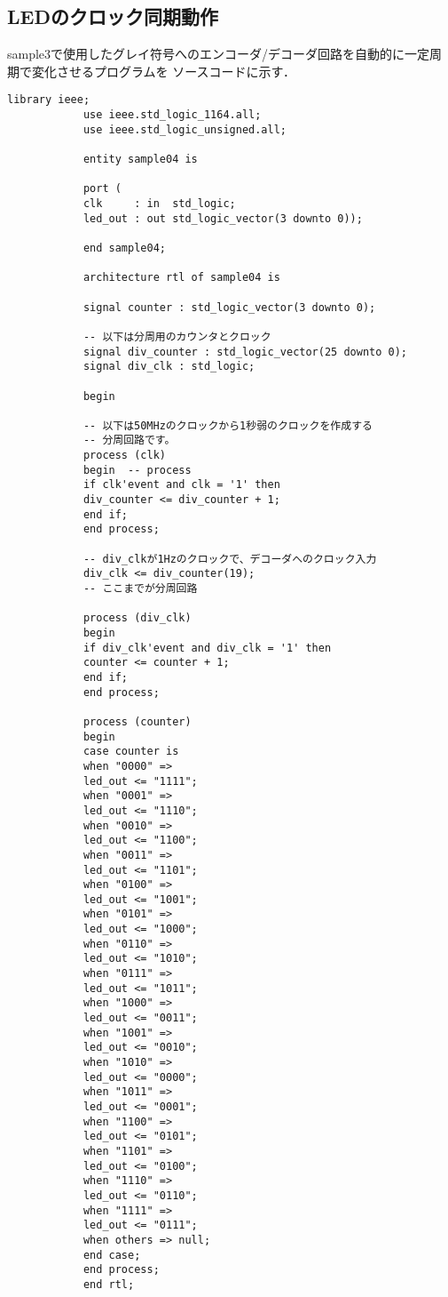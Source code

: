 \documentclass{ltjsarticle}
\begin{document}
	\subsection{LEDのクロック同期動作}
		sample3で使用したグレイ符号へのエンコーダ/デコーダ回路を自動的に一定周期で変化させるプログラムを
		ソースコードに示す．
		\begin{lstlisting}[caption=sample4, label=sample4]
			library ieee;
			use ieee.std_logic_1164.all;
			use ieee.std_logic_unsigned.all;

			entity sample04 is

			port (
			clk     : in  std_logic;
			led_out : out std_logic_vector(3 downto 0));

			end sample04;

			architecture rtl of sample04 is

			signal counter : std_logic_vector(3 downto 0);

			-- 以下は分周用のカウンタとクロック
			signal div_counter : std_logic_vector(25 downto 0);
			signal div_clk : std_logic;

			begin

			-- 以下は50MHzのクロックから1秒弱のクロックを作成する
			-- 分周回路です。
			process (clk)
			begin  -- process
			if clk'event and clk = '1' then
			div_counter <= div_counter + 1;
			end if;
			end process;

			-- div_clkが1Hzのクロックで、デコーダへのクロック入力
			div_clk <= div_counter(19);
			-- ここまでが分周回路

			process (div_clk)
			begin
			if div_clk'event and div_clk = '1' then
			counter <= counter + 1;
			end if;
			end process;

			process (counter)
			begin
			case counter is
			when "0000" =>
			led_out <= "1111";
			when "0001" =>
			led_out <= "1110";
			when "0010" =>
			led_out <= "1100";
			when "0011" =>
			led_out <= "1101";
			when "0100" =>
			led_out <= "1001";
			when "0101" =>
			led_out <= "1000";
			when "0110" =>
			led_out <= "1010";
			when "0111" =>
			led_out <= "1011";
			when "1000" =>
			led_out <= "0011";
			when "1001" =>
			led_out <= "0010";
			when "1010" =>
			led_out <= "0000";
			when "1011" =>
			led_out <= "0001";
			when "1100" =>
			led_out <= "0101";
			when "1101" =>
			led_out <= "0100";
			when "1110" =>
			led_out <= "0110";
			when "1111" =>
			led_out <= "0111";
			when others => null;
			end case;
			end process;
			end rtl;
		\end{lstlisting}
\end{document}
